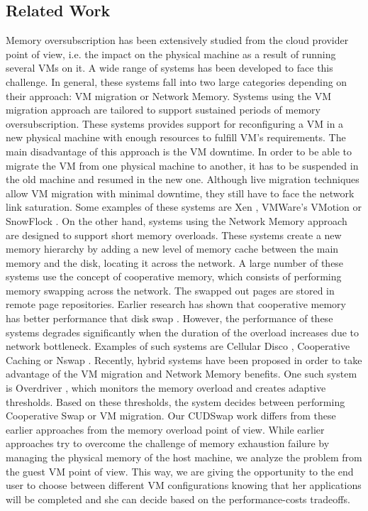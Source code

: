 \subsection{Related Work}\label{subme_related_work}
Memory oversubscription has been extensively \hspace{0.01cm} studied from the cloud provider point of view, i.e.
the impact on the physical machine as a result of running several VMs on it. A wide range of
systems has been developed to face this challenge. In general, these systems fall into two
large categories depending on their approach: VM migration or Network Memory.
Systems using the VM migration approach are tailored to support sustained periods of
memory oversubscription. These systems provides support for reconfiguring a VM in a new
physical machine with enough resources to fulfill VM’s requirements. The main disadvantage of
this approach is the VM downtime. In order to be able to migrate the VM from one physical
machine to another, it has to be suspended in the old machine and resumed in the new one.
Although live migration techniques allow VM migration with minimal downtime, they still have
to face the network link saturation. Some examples of these systems are Xen \cite{Barham2003}, VMWare’s
VMotion \cite{Nelson2005} or SnowFlock \cite{Lagar-Cavilla2009}. On the other hand, systems using the Network Memory approach
are designed to support short memory overloads. These systems create a new memory hierarchy
by adding a new level of memory cache between the main memory and the disk, locating it across
the network. A large number of these systems use the concept of cooperative memory, which
consists of performing memory swapping across the network. The swapped out pages are stored
in remote page repositories. Earlier research has shown that cooperative memory has better
performance that disk swap \cite{Anderson1995}. However, the performance of these systems degrades significantly
when the duration of the overload increases due to network bottleneck. Examples of such
systems are Cellular Disco \cite{Govil2000}, Cooperative Caching \cite{Dahlin1994} or Nswap \cite{Newhall2003}. Recently, hybrid
systems have been proposed in order to take advantage of the VM migration and Network Memory
benefits. One such system is Overdriver \cite{Williams2011}, which monitors the memory overload and creates
adaptive thresholds. Based on these thresholds, the system decides between performing
Cooperative Swap or VM migration. Our CUDSwap work differs from these earlier approaches from
the memory overload point of view. While earlier approaches try to overcome the challenge of
memory exhaustion failure by managing the physical memory of the host machine, we analyze the
problem from the guest VM point of view. This way, we are giving the opportunity to the end
user to choose between different VM configurations knowing that her applications will be
completed and she can decide based on the performance-costs tradeoffs.

